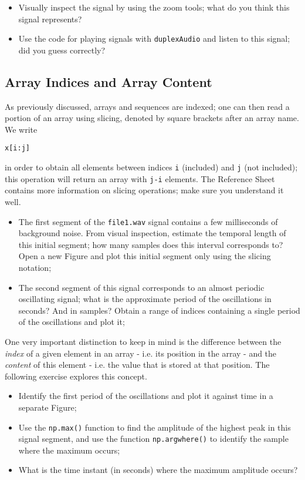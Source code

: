 \begin{itemize}
	\item Visually inspect the signal by using the zoom tools; what do you think this signal represents? 
	\item Use the code for playing signals with {\tt duplexAudio} and listen to this signal; did you guess correctly?
\end{itemize}

\subsection{Array Indices and Array Content}

As previously discussed, arrays and sequences are indexed; one can then read a portion of an array using slicing, denoted by square brackets after an array name. We write

\begin{lstlisting}[frame=single]
x[i:j]
\end{lstlisting}

in order to obtain all elements between indices {\tt i} (included) and {\tt j} (not included); this operation will return an array with {\tt j-i} elements. The Reference Sheet contains more information on slicing operations; make sure you understand it well.

\begin{itemize}
	\item The first segment of the {\tt file1.wav} signal contains a few milliseconds of background noise. From visual inspection, estimate the temporal length of this initial segment; how many samples does this interval corresponds to? Open a new Figure and plot this initial segment only using the slicing notation;
	\item The second segment of this signal corresponds to an almost periodic oscillating signal; what is the approximate period of the oscillations in seconds? And in samples? Obtain a range of indices containing a single period of the oscillations and plot it;
\end{itemize}

One very important distinction to keep in mind is the difference between the \emph{index} of a given element in an array - i.e. its position in the array - and the \emph{content} of this element - i.e. the value that is stored at that position. The following exercise explores this concept.

\begin{itemize}
	\item Identify the first period of the oscillations and plot it against time in a separate Figure;
	\item Use the {\tt np.max()} function to find the amplitude of the highest peak in this signal segment, and use the function {\tt np.argwhere()} to identify the sample where the maximum occurs;
	\item What is the time instant (in seconds) where the maximum amplitude occurs?
\end{itemize}

